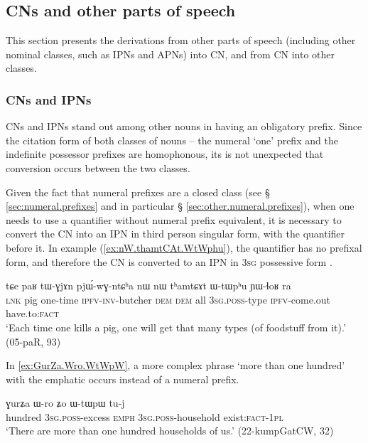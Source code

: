 \subsection{CNs and other parts of speech} \label{sec:CN.parts.of.speech}

This section presents the derivations from other parts of speech (including other nominal classes, such as IPNs and APNs) into CN, and from CN into other classes.

\subsubsection{CNs and IPNs}   \label{sec:CN.IPN}
CNs and IPNs stand out among other nouns in having an obligatory prefix. Since the citation form of both classes of nouns -- the numeral `one' prefix  and the indefinite possessor prefixes  are homophonous, its is not unexpected that conversion occurs between the two classes. 

Given the fact that numeral prefixes are a closed class (see § \ref{sec:numeral.prefixes} and in particular § \ref{sec:other.numeral.prefixes}), when one needs to use a quantifier without numeral prefix equivalent, it is necessary to convert the CN into an IPN in third person singular form, with the quantifier before it. In example (\ref{ex:nW.thamtCAt.WtWphu}), the quantifier  has no prefixal form, and therefore the CN  is converted to an IPN in \textsc{3sg} possessive form .

\begin{exe}
\ex \label{ex:nW.thamtCAt.WtWphu}
\gll tɕe paʁ tɯ-ɣjɤn pjɯ́-wɣ-ntɕʰa nɯ nɯ tʰamtɕɤt ɯ-tɯpʰu ɲɯ-ɬoʁ ra \\ 
 \textsc{lnk} pig one-time \textsc{ipfv}-\textsc{inv}-butcher \textsc{dem} \textsc{dem} all \textsc{3sg}.\textsc{poss}-type \textsc{ipfv}-come.out have.to:\textsc{fact} \\
\glt `Each time one kills a pig, one will get that many types (of foodstuff from it).' (05-paR, 93)
\end{exe}

In \ref{ex:GurZa.Wro.WtWpW}, a more complex phrase  `more than one hundred' with the emphatic  occurs instead of a numeral prefix.

\begin{exe}
\ex \label{ex:GurZa.Wro.WtWpW}
\gll ɣurʑa ɯ-ro ʑo ɯ-tɯpɯ tu-j \\
 hundred \textsc{3sg}.\textsc{poss}-excess \textsc{emph} \textsc{3sg}.\textsc{poss}-household exist:\textsc{fact}-\textsc{1pl} \\
\glt `There are more than one hundred households of us.' (22-kumpGatCW, 32)
\end{exe}

